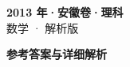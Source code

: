 \documentclass[zihao=-4, a4paper]{ctexart}
\begin{document}
\begin{center}
  {\Large\bfseries 2013 年·安徽卷·理科}\\[4pt]
  {\large 数学 · 解析版}
\end{center}
\medskip
{}

\clearpage
{}
\begin{center}{\Large\bfseries 参考答案与详细解析}\end{center}
\medskip

\end{document}

